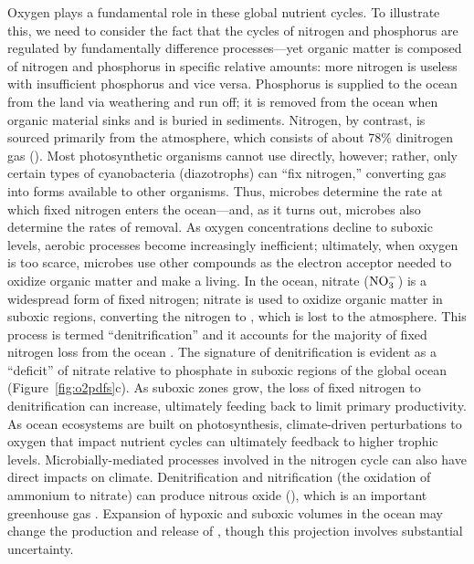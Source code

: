 \documentclass[draft,linenumbers]{report_chapter}
\begin{document}
Oxygen plays a fundamental role in these global nutrient cycles.
To illustrate this, we need to consider the fact that the cycles of nitrogen and phosphorus are regulated by fundamentally difference processes---yet organic matter is composed of nitrogen and phosphorus in specific relative amounts: more nitrogen is useless with insufficient phosphorus and vice versa.
Phosphorus is supplied to the ocean from the land via weathering and run off; it is removed from the ocean when organic material sinks and is buried in sediments.
Nitrogen, by contrast, is sourced primarily from the atmosphere, which consists of about 78\% dinitrogen gas ().
Most photosynthetic organisms cannot use  directly, however; rather, only certain types of cyanobacteria (diazotrophs) can ``fix nitrogen,'' converting  gas into forms available to other organisms.
Thus, microbes determine the rate at which fixed nitrogen enters the ocean---and, as it turns out, microbes also determine the rates of removal.
As oxygen concentrations decline to suboxic levels, aerobic processes become increasingly inefficient; ultimately, when oxygen is too scarce, microbes use
other compounds as the electron acceptor needed to oxidize organic matter and make a living.
In the ocean, nitrate ($\ce{NO3}^-$) is a widespread form of fixed nitrogen; nitrate is used to oxidize organic matter in suboxic regions, converting the nitrogen to , which is lost to the atmosphere.
This process is termed ``denitrification'' and it accounts for the majority of fixed nitrogen loss from the ocean \citep{Gruber-2004,Gruber-Galloway-2008}.
The signature of denitrification is evident as a ``deficit'' of nitrate relative to phosphate in suboxic regions of the global ocean (Figure~\ref{fig:o2pdfs}c).
As suboxic zones grow, the loss of fixed nitrogen to denitrification can increase, ultimately feeding back to limit primary productivity.
As ocean ecosystems are built on photosynthesis, climate-driven perturbations to oxygen that impact nutrient cycles can ultimately feedback to higher trophic levels.
Microbially-mediated processes involved in the nitrogen cycle can also have direct impacts on climate.
Denitrification and nitrification (the oxidation of ammonium to nitrate) can produce nitrous oxide (), which is an important greenhouse gas \citep{Bange-Freing-etal-2010}.
Expansion of hypoxic and suboxic volumes in the ocean may change the production and release of  \citep{Nevison-Butler-etal-2003,Martinez-Rey-Bopp-etal-2015}, though this projection involves substantial uncertainty.
\end{document}
